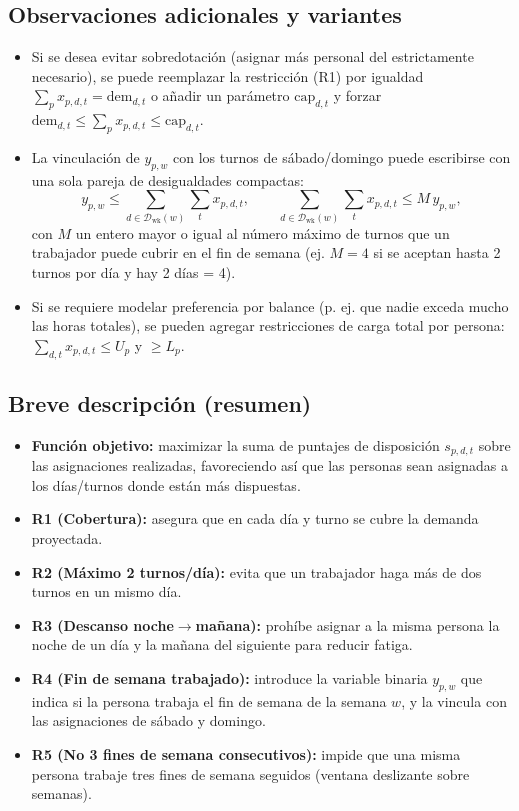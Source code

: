 \documentclass{article}
\begin{document}
\subsection*{Observaciones adicionales y variantes}
\begin{itemize}
  \item Si se desea evitar sobredotación (asignar más personal del estrictamente necesario), se puede reemplazar la restricción (R1) por igualdad
  \(\sum_{p} x_{p,d,t} = \text{dem}_{d,t}\) o a\~nadir un parámetro \(\text{cap}_{d,t}\) y forzar \(\text{dem}_{d,t} \le \sum_{p} x_{p,d,t} \le \text{cap}_{d,t}\).
  \item La vinculación de \(y_{p,w}\) con los turnos de sábado/domingo puede escribirse con una sola pareja de desigualdades compactas:
  \[
  y_{p,w} \le \sum_{d\in\mathcal{D}_{\text{wk}}(w)}\sum_{t} x_{p,d,t}, \qquad
  \sum_{d\in\mathcal{D}_{\text{wk}}(w)}\sum_{t} x_{p,d,t} \le M\, y_{p,w},
  \]
  con \(M\) un entero mayor o igual al número máximo de turnos que un trabajador puede cubrir en el fin de semana (ej. \(M=4\) si se aceptan hasta 2 turnos por día y hay 2 días = 4).
  \item Si se requiere modelar preferencia por balance (p. ej. que nadie exceda mucho las horas totales), se pueden agregar restricciones de carga total por persona:
  \(\sum_{d,t} x_{p,d,t} \le U_p\) y \(\ge L_p\).
\end{itemize}

\subsection*{Breve descripción (resumen)}
\begin{itemize}
  \item \textbf{Función objetivo:} maximizar la suma de puntajes de disposición \(s_{p,d,t}\) sobre las asignaciones realizadas, favoreciendo así que las personas sean asignadas a los días/turnos donde están más dispuestas.
  \item \textbf{R1 (Cobertura):} asegura que en cada día y turno se cubre la demanda proyectada.
  \item \textbf{R2 (Máximo 2 turnos/día):} evita que un trabajador haga más de dos turnos en un mismo día.
  \item \textbf{R3 (Descanso noche$\rightarrow$mañana):} prohíbe asignar a la misma persona la noche de un día y la mañana del siguiente para reducir fatiga.
  \item \textbf{R4 (Fin de semana trabajado):} introduce la variable binaria \(y_{p,w}\) que indica si la persona trabaja el fin de semana de la semana \(w\), y la vincula con las asignaciones de sábado y domingo.
  \item \textbf{R5 (No 3 fines de semana consecutivos):} impide que una misma persona trabaje tres fines de semana seguidos (ventana deslizante sobre semanas).
\end{itemize}
\end{document}
